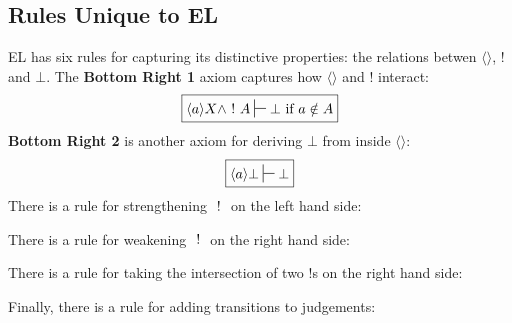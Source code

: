 \subsection{Rules Unique to EL}
EL has six rules for capturing its distinctive properties: the relations betwen $\langle \rangle$, $!$ and $\bot$.
The {\bf Bottom Right 1} axiom captures how $\langle \rangle$ and $!$ interact:
\[
\boxed
{
\langle a \rangle X \land \fBang A \judge \bot \mbox{ if } a \notin A
}
\]
{\bf Bottom Right 2} is another axiom for deriving $\bot$ from inside $\langle \rangle$:
\[
\boxed
{
\langle a \rangle \bot \judge \bot
}
\]
There is a rule for strengthening $\ ! \ $ on the left hand side: 
\begin{center}
\end{center}
There is a rule for weakening $\ ! \ $ on the right hand side: 
\begin{center}
\end{center}
There is a rule for taking the intersection of two $!$s on the right hand side:
\begin{center}
\end{center}
Finally, there is a rule for adding transitions to judgements:
\begin{center}
\end{center}


